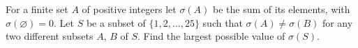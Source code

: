 For a finite set $A$ of positive integers let $\sigma(A)$ be the sum of its elements, with $\sigma(\varnothing)=0$. Let $S$ be a subset of $\{1,2,\dots,25\}$ such that $\sigma(A)\ne\sigma(B)$ for any two different subsets $A$, $B$ of $S$. Find the largest possible value of $\sigma(S)$.
